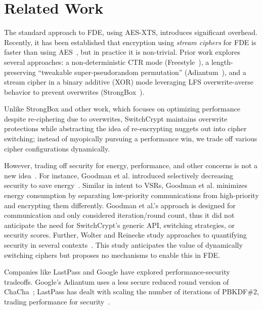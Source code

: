 \section{Related Work}\label{sec:related}

The standard approach to FDE, using AES-XTS, introduces significant overhead.
Recently, it has been established that encryption using \emph{stream ciphers}
for FDE is faster than using AES~\cite{StrongBox, AnotherPaper1, AnotherPaper2},
but in practice it is non-trivial. Prior work explores several approaches: a
non-deterministic CTR mode (Freestyle~\cite{Freestyle}), a length-preserving
``tweakable super-pseudorandom permutation'' (Adiantum~\cite{Adiantum}), and a
stream cipher in a binary additive (XOR) mode leveraging LFS overwrite-averse
behavior to prevent overwrites (StrongBox~\cite{StrongBox}).

Unlike StrongBox and other work, which focuses on optimizing performance despite
re-ciphering due to overwrites, SwitchCrypt maintains overwrite protections
while abstracting the idea of re-encrypting nuggets out into cipher switching;
instead of myopically pursuing a performance win, we trade off various cipher
configurations dynamically.

However, trading off security for energy, performance, and other concerns is not
a new idea~\cite{ScalableSecurity, WolterReinecke, ZengChow1, ZengChow2,
HaleemEtAl, LiOmiecinski}. For instance, Goodman et al. introduced selectively
decreasing security to save energy~\cite{ScalableSecurity}. Similar in intent to
VSRs, Goodman et al. minimizes energy consumption by separating low-priority
communications from high-priority and encrypting them differently. Goodman et
al.'s approach is designed for communication and only considered iteration/round
count, thus it did not anticipate the need for SwitchCrypt's generic API,
switching strategies, or security scores. Further, Wolter and Reinecke study
approaches to quantifying security in several contexts~\cite{WolterReinecke}.
This study anticipates the value of dynamically switching ciphers but proposes
no mechanisms to enable this in FDE.

Companies like LastPass and Google have explored performance-security tradeoffs.
Google's Adiantum uses a less secure reduced round version of
ChaCha~\cite{Adiantum}; LastPass has dealt with scaling the number of iterations
of PBKDF\#2, trading performance for security~\cite{LastPass}. 
